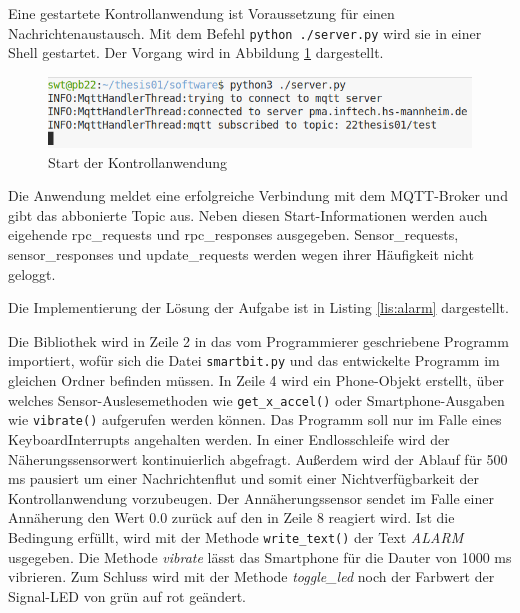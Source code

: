 \documentclass[11pt,a4paper]{report}
\begin{document}
Eine gestartete Kontrollanwendung ist Voraussetzung für einen Nachrichtenaustausch.
Mit dem Befehl \texttt{python ./server.py} wird sie in einer Shell gestartet.
Der Vorgang wird in Abbildung \ref{fig:start_controll_app} dargestellt.
\begin{figure}[htbp]
  \centering
  \includegraphics[width=.8\textwidth]{images/server_logging}
  \caption{Start der Kontrollanwendung}
  \label{fig:start_controll_app}
\end{figure}
Die Anwendung meldet eine erfolgreiche Verbindung mit dem MQTT-Broker und gibt das abbonierte Topic aus.
Neben diesen Start-Informationen werden auch eigehende rpc\_requests und rpc\_responses ausgegeben.
Sensor\_requests, sensor\_responses und update\_requests werden wegen ihrer Häufigkeit nicht geloggt.

Die Implementierung der Lösung der Aufgabe ist in Listing \ref{lis:alarm} dargestellt.
\lstset{language=python, captionpos=b, frame=single, numberstyle=\tiny, style=customcs}

Die Bibliothek wird in Zeile 2 in das vom Programmierer geschriebene Programm importiert, wofür sich die Datei \texttt{smartbit.py} und das entwickelte Programm im gleichen Ordner befinden müssen.
In Zeile 4 wird ein Phone-Objekt erstellt, über welches Sensor-Auslesemethoden wie \texttt{get\_x\_accel()} oder Smartphone-Ausgaben wie \texttt{vibrate()} aufgerufen werden können.
Das Programm soll nur im Falle eines KeyboardInterrupts angehalten werden.
In einer Endlosschleife wird der Näherungssensorwert kontinuierlich abgefragt.
Außerdem wird der Ablauf für 500 ms pausiert um einer Nachrichtenflut und somit einer Nichtverfügbarkeit der Kontrollanwendung vorzubeugen.
Der Annäherungssensor sendet im Falle einer Annäherung den Wert 0.0 zurück auf den in Zeile 8 reagiert wird.
Ist die Bedingung erfüllt, wird mit der Methode \texttt{write\_text()} der Text \textit{ALARM} usgegeben.
Die Methode \textit{vibrate} lässt das Smartphone für die Dauter von 1000 ms vibrieren.
Zum Schluss wird mit der Methode \textit{toggle\_led} noch der Farbwert der Signal-LED von grün auf rot geändert.
\end{document}
